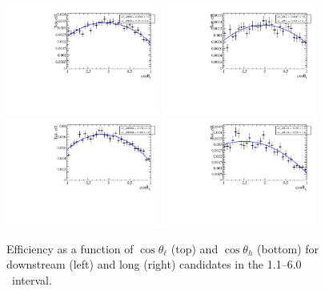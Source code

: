 \begin{figure}[h]
\centering
\includegraphics[width=0.45\textwidth]{Lmumu/figs/efficiencies/angular/DDeffFit_q2_110_600.pdf}
\includegraphics[width=0.45\textwidth]{Lmumu/figs/efficiencies/angular/LLeffFit_q2_110_600.pdf}
\includegraphics[width=0.45\textwidth]{Lmumu/figs/efficiencies/angular/DDeffFitB_q2_110_600.pdf}
\includegraphics[width=0.45\textwidth]{Lmumu/figs/efficiencies/angular/LLeffFitB_q2_110_600.pdf}
\caption{Efficiency as a function of $\cos\theta_\ell$ (top) and $\cos\theta_h$ (bottom) for
downstream (left) and long (right) candidates in the 1.1--6.0 \gevgevcccc ~\qsq interval.  }
\label{fig:cosThetaBeffLow}
\end{figure}
%
%


